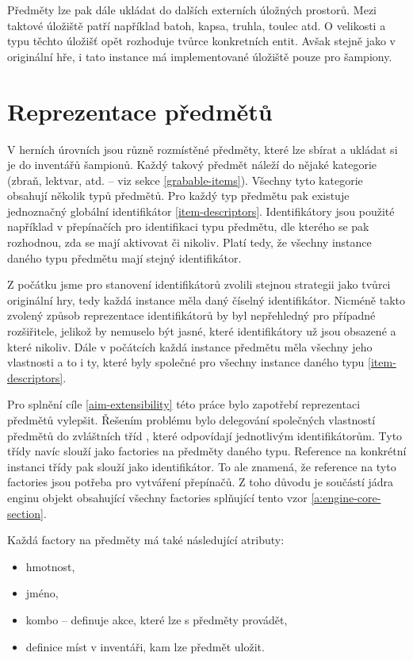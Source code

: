 Předměty lze pak dále ukládat do dalších externích úložných prostorů. 
Mezi taktové úložiště patří například batoh, kapsa, truhla, toulec atd.
O velikosti a typu těchto úložišť opět rozhoduje tvůrce konkretních 
entit. Avšak stejně jako v originální hře, i tato instance má implementované 
úložiště pouze pro šampiony.

\section{Reprezentace předmětů}\label{item-factories}

V herních úrovních jsou různě rozmístěné předměty, které lze sbírat a ukládat si je do inventářů šampionů.
Každý takový předmět náleží do nějaké kategorie (zbraň, lektvar, atd. -- viz sekce \ref{grabable-items}). Všechny 
tyto kategorie obsahují několik typů předmětů. Pro každý typ předmětu pak existuje jednoznačný globální identifikátor \vref{item-descriptors}.
Identifikátory jsou použité například v přepínačích pro identifikaci typu předmětu, dle kterého se pak rozhodnou, 
zda se mají aktivovat či nikoliv. Platí tedy, že všechny instance daného typu předmětu mají stejný identifikátor.

Z počátku jsme pro stanovení identifikátorů zvolili stejnou strategii jako tvůrci originální hry, tedy každá
instance měla daný číselný identifikátor.
Nicméně takto zvolený způsob reprezentace identifikátorů by byl nepřehledný pro případné rozšiřitele, jelikož
by nemuselo být jasné, které identifikátory už jsou obsazené a které nikoliv. Dále v počátcích každá instance
předmětu měla všechny jeho vlastnosti a to i ty, které byly společné pro všechny instance daného typu \vref{item-descriptors}.

Pro splnění cíle \ref{aim-extensibility} této práce bylo zapotřebí reprezentaci předmětů vylepšit.
Řešením problému bylo delegování společných vlastností předmětů do zvláštních tříd , které odpovídají jednotlivým identifikátorům.
Tyto třídy navíc slouží jako factories na předměty daného typu. Reference na konkrétní instanci třídy pak slouží jako identifikátor.
To ale znamená, že reference na tyto factories jsou potřeba pro vytváření přepínačů. Z toho důvodu je součástí jádra enginu
objekt obsahující všechny factories splňující tento vzor \vref{a:engine-core-section}.


Každá factory na předměty má také následující atributy:
\begin{itemize}
\item hmotnost, 
\item jméno, 
\item kombo -- definuje akce, které lze s předměty provádět,  
\item definice míst v inventáři, kam lze předmět uložit. 
\end{itemize}

